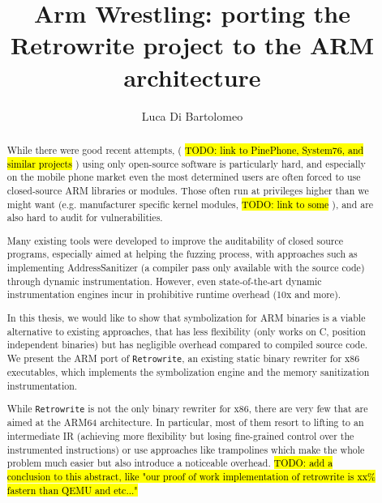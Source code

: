 \documentclass[a4paper,11pt,oneside]{report}
\title{Arm Wrestling: porting the Retrowrite project to the ARM architecture}
\author{Luca Di Bartolomeo} \adviser{Prof. Mathias Payer (EPFL)}
\newcommand{\todo}[1]{%
	\begingroup 
	\sethlcolor{cyan}%
	\hl{TODO: #1}%
	\endgroup
}
\begin{document}
\maketitle
\makededication
\makeacks


\begin{abstract}

	While there were good recent attempts, (\todo{link to PinePhone, System76,
	and similar projects}) using only open-source software is particularly
	hard, and especially on the mobile phone market even the most determined
	users are often forced to use closed-source ARM libraries or modules.  
	Those often run at privileges higher than we might want (e.g. manufacturer
	specific kernel modules, \todo{link to some}), and are also hard to audit
	for vulnerabilities. 

	Many existing tools were developed to improve the auditability of closed
	source programs, especially aimed at helping the fuzzing process, with
	approaches such as implementing AddressSanitizer (a compiler pass only
	available with the source code) through dynamic instrumentation. However,  
	even state-of-the-art dynamic instrumentation engines incur in prohibitive 
	runtime overhead (10x and more). 

	In this thesis, we would like to show that symbolization for ARM binaries 
	is a viable alternative to existing approaches, that has less flexibility 
	(only works on C, position independent binaries) but has
	negligible overhead compared to compiled source code. We present the ARM
	port of \texttt{Retrowrite}, an existing static binary rewriter for x86
	executables, which implements the symbolization engine and the memory
	sanitization instrumentation. 

	While \texttt{Retrowrite} is not the only binary rewriter for x86, there 
	are very few that are aimed at the ARM64 architecture. In particular, most 
	of them resort to lifting to an intermediate IR (achieving more flexibility 
	but losing fine-grained control over the instrumented instructions) or use 
	approaches like trampolines which make the whole problem much easier but 
	also introduce a noticeable overhead.
	\todo{add a conclusion to this abstract, like "our proof of work 
	implementation of retrowrite is xx\% fastern than QEMU and etc..."}


\end{abstract}


\maketoc

\end{document}
